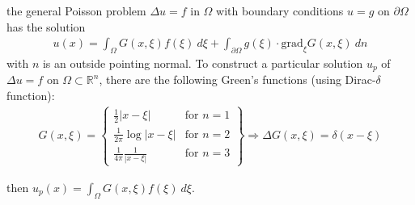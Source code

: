 the general Poisson problem $\Delta u = f$ in $\Omega$ with boundary conditions $u = g$ on $\partial\Omega$ has the solution
\begin{align*}
    u(x) = \int_\Omega G(x,\xi)f(\xi)\ d\xi + \int_{\partial\Omega} g(\xi)\cdot\mathrm{grad}_\xi G(x,\xi)\ dn
\end{align*}
with $n$ is an outside pointing normal.
To construct a particular solution $u_p$ of $\Delta u=f$ on $\Omega \subset \mathbb{R}^n$, there are the following Green's
functions (using Dirac-$\delta$ function):
\begin{align*}
    G(x,\xi) = \left\{
    \begin{matrix}
        \frac{1}{2}|x-\xi| & \text{for }n = 1 \\
        \frac{1}{2\pi}\log|x-\xi| & \text{for }n = 2 \\
        \frac{1}{4\pi}\frac{1}{|x-\xi|} & \text{for }n = 3
    \end{matrix}
    \right\}\Rightarrow\Delta G(x,\xi) = \delta(x-\xi)
\end{align*}

then $u_p(x) = \int_\Omega G(x,\xi)f(\xi)\ d\xi$.
